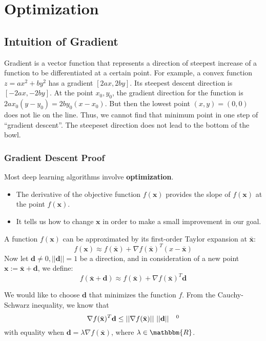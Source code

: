 \chapter{Optimization}
\label{ch:optimization}

\section{Intuition of Gradient}

Gradient is a vector function that represents a direction of steepest increase of a function to be differentiated at a certain point. For example, a convex function $z = ax^2+by^2$ has a gradient $[2ax, 2by]$. Its steepest descent direction is $[-2ax, -2by]$. At the point $x_0,y_0$, the gradient direction for the function is $2ax_0(y-y_0) = 2by_0(x-x_0)$. But then the lowest point $(x,y) = (0,0)$ does not lie on the line. Thus, we cannot find that minimum point in one step of ``gradient descent''. The steepeset direction does not lead to the bottom of the bowl. 

\subsection{Gradient Descent Proof}

Most deep learning algorithms involve \textbf{optimization}.

\begin{itemize}
	\item The derivative of the objective function $f(\mathbf{x})$ provides the slope of $f(\mathbf{x})$ at the point $f(\mathbf{x})$.
	\item It tells us how to change $\mathbf{x}$ in order to make a small improvement in our goal.
\end{itemize}

	A function $f(\mathbf{x})$ can be approximated by its first-order Taylor expansion at $\bar{\mathbf{x}}$:
	$$f(\mathbf{x})\approx f(\bar{\mathbf{x}})+\nabla f(\bar{\mathbf{x}})^T(x-\bar{\mathbf{x}})$$
	Now let $\mathbf{d}\neq0, ||\mathbf{d}||=1$ be a direction, and in consideration of a new point $\mathbf{x}:=\bar{\mathbf{x}}+\mathbf{d}$, we define:
	$$f(\bar{\mathbf{x}}+\mathbf{d})\approx f(\bar{\mathbf{x}})+\nabla f(\bar{\mathbf{x}})^T\mathbf{d}$$

We would like to choose $\mathbf{d}$ that minimizes the function $f$. From the Cauchy-Schwarz inequality, we know that
$$\nabla f(\bar{\mathbf{x}})^T\mathbf{d}\leq ||\nabla f(\bar{\mathbf{x}})||\textrm{ }||\mathbf{d}||  \quad \footnotemark[0]$$
with equality when $\mathbf{d}=\lambda \nabla f(\bar{\mathbf{x}})$, where $\lambda\in \mathbbm{R}$.

